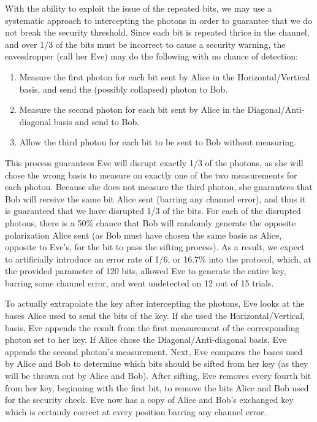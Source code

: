 \documentclass{article}
\begin{document}
With the ability to exploit the issue of the repeated bits, we may use a systematic approach to intercepting the photons in order to guarantee that we do not break the security threshold. Since each bit is repeated thrice in the channel, and over 1/3 of the bits must be incorrect to cause a security warning, the eavesdropper (call her Eve) may do the following with no chance of detection:
\begin{enumerate}
\item Measure the first photon for each bit sent by Alice in the Horizontal/Vertical basis, and send the (possibly collapsed) photon to Bob.
\item Measure the second photon for each bit sent by Alice in the 
Diagonal/Anti-diagonal basis and send to Bob.
\item Allow the third photon for each bit to be sent to Bob without measuring.
\end{enumerate}
This process guarantees Eve will disrupt exactly 1/3 of the photons, as she will chose the wrong basis to measure on exactly one of the two measurements for each photon. Because she does not measure the third photon, she guarantees that Bob will receive the same bit Alice sent (barring any channel error), and thus it is guaranteed that we have disrupted 1/3 of the bits. For each of the disrupted photons, there is a 50\% chance that Bob will randomly generate the opposite polarization Alice sent (as Bob must have chosen the same basis as Alice, opposite to Eve's, for the bit to pass the sifting process). As a result, we expect to artificially introduce an error rate of 1/6, or 16.7\% into the protocol, which, at the provided parameter of 120 bits, allowed Eve to generate the entire key, barring some channel error, and went undetected on 12 out of 15 trials.

To actually extrapolate the key after intercepting the photons, Eve looks at the bases Alice used to send the bits of the key. If she used the Horizontal/Vertical, basis, Eve appends the result from the first measurement of the corresponding photon set to her key. If Alice chose the Diagonal/Anti-diagonal basis, Eve appends the second photon's measurement. Next, Eve compares the bases used by Alice and Bob to determine which bits should be sifted from her key (as they will be thrown out by Alice and Bob). After sifting, Eve removes every fourth bit from her key, beginning with the first bit, to remove the bits Alice and Bob used for the security check. Eve now has a copy of Alice and Bob's exchanged key which is certainly correct at every position barring any channel error.
\end{document}
